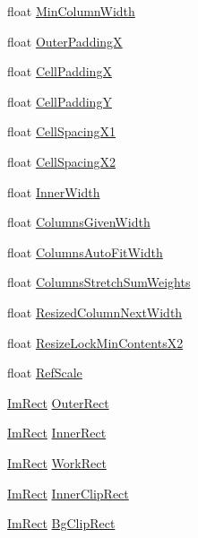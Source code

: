 \begin{DoxyCompactItemize}
\item 
float \hyperlink{structImGuiTable_a4eb7492114618b5c15abdeec7d71ad2f}{Min\+Column\+Width}
\item 
float \hyperlink{structImGuiTable_a05c1d38368970a409eaaf83fb06292cc}{Outer\+PaddingX}
\item 
float \hyperlink{structImGuiTable_a66d3dd51b20c89305d736fdcd0e7a701}{Cell\+PaddingX}
\item 
float \hyperlink{structImGuiTable_ab48f51c68023105a76a062636424700c}{Cell\+PaddingY}
\item 
float \hyperlink{structImGuiTable_a3e07bf133695e0131dcf608aa9ec1143}{Cell\+Spacing\+X1}
\item 
float \hyperlink{structImGuiTable_a5f6b9f6696fa8a32296ee6d859356fcc}{Cell\+Spacing\+X2}
\item 
float \hyperlink{structImGuiTable_acc6781cae73928ba8dca19cae61dccb1}{Inner\+Width}
\item 
float \hyperlink{structImGuiTable_aefc860a8a1fdc36347d1d4224aae810f}{Columns\+Given\+Width}
\item 
float \hyperlink{structImGuiTable_a7c42c7caf5a05ac02305aa356f29a9a4}{Columns\+Auto\+Fit\+Width}
\item 
float \hyperlink{structImGuiTable_a3f24cf9f90a85c11dcfb742d157e31ea}{Columns\+Stretch\+Sum\+Weights}
\item 
float \hyperlink{structImGuiTable_ab1f45cc1c2eca4d78a2c8eaf202a651a}{Resized\+Column\+Next\+Width}
\item 
float \hyperlink{structImGuiTable_a92324407723470ac6b102e2201b09ce2}{Resize\+Lock\+Min\+Contents\+X2}
\item 
float \hyperlink{structImGuiTable_a21f1ccb2537abbf1fd8ba5f5ddcae612}{Ref\+Scale}
\item 
\hyperlink{structImRect}{Im\+Rect} \hyperlink{structImGuiTable_a6f98734a1abb8f866ffd9fc69d35b2a3}{Outer\+Rect}
\item 
\hyperlink{structImRect}{Im\+Rect} \hyperlink{structImGuiTable_a6d2deeb579e5caff1a9fce372003a68c}{Inner\+Rect}
\item 
\hyperlink{structImRect}{Im\+Rect} \hyperlink{structImGuiTable_a4e0fd51349a7bedc8321f3977ff9e48c}{Work\+Rect}
\item 
\hyperlink{structImRect}{Im\+Rect} \hyperlink{structImGuiTable_a695a8cfb51a47bf557de0a2fd10744d2}{Inner\+Clip\+Rect}
\item 
\hyperlink{structImRect}{Im\+Rect} \hyperlink{structImGuiTable_a07e838bd92bd6531121bfde156b23e7d}{Bg\+Clip\+Rect}
\item 

\end{DoxyCompactItemize}
